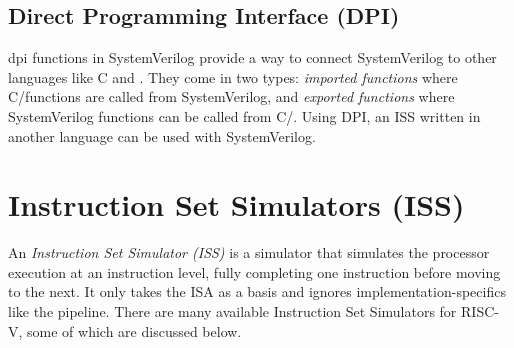 \subsection{Direct Programming Interface (DPI)}
\label{sec:bg_dpi}

\acrfull{dpi} functions in SystemVerilog provide a way to connect SystemVerilog to other languages like C and \cpp \cite{spearSystemVerilogVerificationGuide2012}. They come in two types: \textit{imported functions} where C/\cpp functions are called from  SystemVerilog, and \textit{exported functions} where SystemVerilog functions can be called from C/\cpp. Using DPI, an ISS written in another language can be used with SystemVerilog. 


\section{Instruction Set Simulators (ISS) }
\label{sec:bg_iss}

An \textit{Instruction Set Simulator (ISS)} is a simulator that simulates the processor execution at an instruction level, fully completing one instruction before moving to the next.
It only takes the ISA as a basis and ignores implementation-specifics like the pipeline.
There are many available Instruction Set Simulators for RISC-V, some of which are discussed below.

